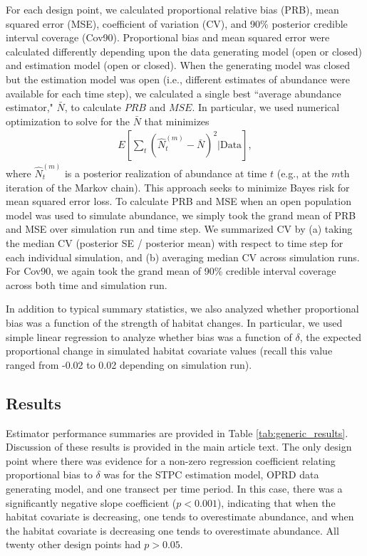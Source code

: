 \documentclass[12pt,fleqn]{article}
\begin{document}
\begin{flushleft}
\hspace{.5in} For each design point, we calculated proportional relative bias (PRB), mean squared error (MSE), coefficient of variation (CV), and 90\% posterior credible interval coverage (Cov90).  Proportional bias and mean squared error were calculated differently depending upon the data generating model (open or closed) and estimation model (open or closed).  When the generating model was closed but the estimation model was open (i.e., different estimates of abundance were available for each time step), we calculated a single best ``average abundance estimator," $\bar{N}$, to calculate $PRB$ and $MSE$.  In particular, we used numerical optimization \citep[via the `BFGS' minimizer in function \texttt{optim} in the R programming environment][]{RTeam2013} to solve for the $\bar{N}$ that minimizes
\begin{eqnarray*}
  E \left[ \sum_t (\hat{N}_t^{(m)} - \bar{N})^2 | \text{Data} \right],
\end{eqnarray*}
where $\hat{N}_t^{(m)}$ is a posterior realization of abundance at time $t$ (e.g., at the $m$th iteration of the Markov chain).  This approach seeks to minimize Bayes risk for mean squared error loss. To calculate PRB and MSE when an open population model was used to simulate abundance, we simply took the grand mean of PRB and MSE over simulation run and time step.  We summarized CV by (a) taking the median CV (posterior SE / posterior mean) with respect to time step for each individual simulation, and (b) averaging median CV across simulation runs.  For Cov90, we again took the grand mean of 90\% credible interval coverage across both time and simulation run.

\hspace{.5in} In addition to typical summary statistics, we also analyzed whether proportional bias was a function of the strength of habitat changes.  In particular, we used simple linear regression to analyze whether bias was a function of $\delta$, the expected proportional change in simulated habitat covariate values (recall this value ranged from -0.02 to 0.02 depending on simulation run).

\subsection{Results}


Estimator performance summaries are provided in Table \ref{tab:generic_results}.  Discussion of these results is provided in the main article text.  The only design point where there was evidence for a non-zero regression coefficient relating proportional bias to $\delta$ was for the STPC estimation model, OPRD data generating model, and one transect per time period. In this case, there was a significantly negative slope coefficient ($p<0.001$), indicating that when the habitat covariate is decreasing, one tends to overestimate abundance, and when the habitat covariate is decreasing one tends to overestimate abundance.  All twenty other design points had $p>0.05$.





\end{flushleft}
\end{document}
